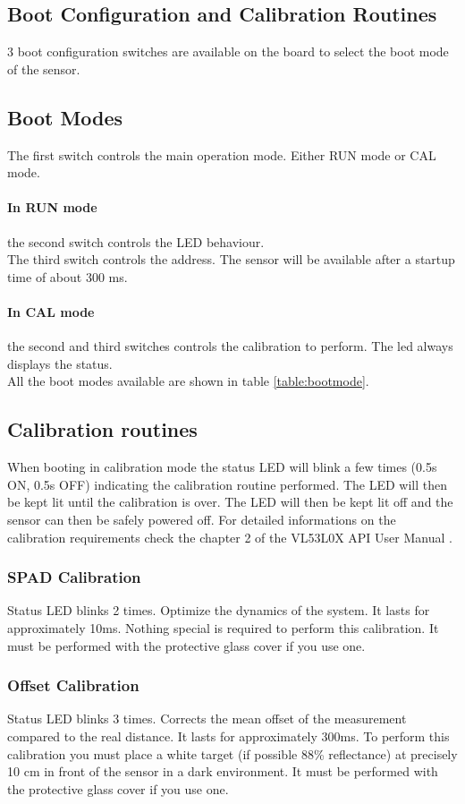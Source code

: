 \begin{multicols}{2}
\section{Boot Configuration and Calibration Routines}
3 boot configuration switches are available on the board to select the boot mode of the sensor.
\subsection{Boot Modes} \label{sec:BootModes}
The first switch controls the main operation mode. Either RUN mode or CAL mode.
\paragraph{In RUN mode} the second switch controls the LED behaviour.\\
The third switch controls the \iic address. The sensor will be available after a startup time of about 300 ms.
\paragraph{In CAL mode} the second and third switches controls the calibration to perform. The led always displays the status.\\
All the boot modes available are shown in table \ref{table:bootmode}.

\subsection{Calibration routines}
When booting in calibration mode the status LED will blink a few times (0.5s ON, 0.5s OFF) indicating the calibration routine performed. The LED will then be kept lit until the calibration is over. The LED will then be kept lit off and the sensor can then be safely powered off. For detailed informations on the calibration requirements check the chapter 2 of the VL53L0X API User Manual \cite{tofAPI}.

\subsubsection{SPAD Calibration}
Status LED blinks 2 times. Optimize the dynamics of the system. It lasts for approximately 10ms. Nothing special is required to perform this calibration. It must be performed with the protective glass cover if you use one.

\subsubsection{Offset Calibration}
Status LED blinks 3 times. Corrects the mean offset of the measurement compared to the real distance. It lasts for approximately 300ms. To perform this calibration you must place a white target (if possible 88\% reflectance) at precisely 10 cm in front of the sensor in a dark environment. It must be performed with the protective glass cover if you use one.


\end{multicols}
